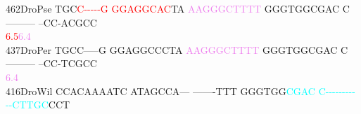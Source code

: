 \documentclass[11pt,twoside,reqno,a4paper]{article}
\begin{document}
{462\hspace*{1\charwidth}DroPse	TGC\textcolor{red}{C}\textcolor{red}{-}\textcolor{red}{-}\textcolor{red}{-}\textcolor{red}{-}\textcolor{red}{-}\textcolor{red}{G}	\textcolor{red}{G}\textcolor{red}{G}\textcolor{red}{A}\textcolor{red}{G}\textcolor{red}{G}\textcolor{red}{C}\textcolor{red}{A}\textcolor{red}{C}TA	\textcolor{violet}{A}\textcolor{violet}{A}\textcolor{violet}{G}\textcolor{violet}{G}\textcolor{violet}{G}\textcolor{violet}{C}\textcolor{violet}{T}\textcolor{violet}{T}\textcolor{violet}{T}\textcolor{violet}{T}	GGGTGGCGAC	C---------	--CC-ACGCC	\\
\hspace*{4\charwidth}\hspace*{7\charwidth}\hspace*{3\charwidth}\textcolor{red}{6.5}\hspace*{1\charwidth}\hspace*{1\charwidth}\hspace*{14\charwidth}\textcolor{violet}{6.4}\hspace*{1\charwidth}\hspace*{1\charwidth}\hspace*{1\charwidth}\hspace*{1\charwidth}\\
437\hspace*{1\charwidth}DroPer	TGCC-----G	GGAGGCCCTA	\textcolor{violet}{A}\textcolor{violet}{A}\textcolor{violet}{G}\textcolor{violet}{G}\textcolor{violet}{G}\textcolor{violet}{C}\textcolor{violet}{T}\textcolor{violet}{T}\textcolor{violet}{T}\textcolor{violet}{T}	GGGTGGCGAC	C---------	--CC-TCGCC	\\
\hspace*{4\charwidth}\hspace*{7\charwidth}\hspace*{1\charwidth}\hspace*{1\charwidth}\hspace*{20\charwidth}\textcolor{violet}{6.4}\hspace*{1\charwidth}\hspace*{1\charwidth}\hspace*{1\charwidth}\hspace*{1\charwidth}\\
416\hspace*{1\charwidth}DroWil	CCACAAAATC	ATAGCCA---	-------TTT	GGGTGG\textcolor{cyan}{C}\textcolor{cyan}{G}\textcolor{cyan}{A}\textcolor{cyan}{C}	\textcolor{cyan}{C}\textcolor{cyan}{-}\textcolor{cyan}{-}\textcolor{cyan}{-}\textcolor{cyan}{-}\textcolor{cyan}{-}\textcolor{cyan}{-}\textcolor{cyan}{-}\textcolor{cyan}{-}\textcolor{cyan}{-}	\textcolor{cyan}{-}\textcolor{cyan}{-}\textcolor{cyan}{C}\textcolor{cyan}{T}\textcolor{cyan}{T}\textcolor{cyan}{G}\textcolor{cyan}{C}CCT	\\
}
\end{document}
